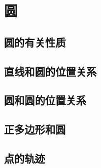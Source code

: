 \chapter{圆}

\section{圆的有关性质}








\section{直线和圆的位置关系}








\section{圆和圆的位置关系}





\section{正多边形和圆}







\section{点的轨迹}









